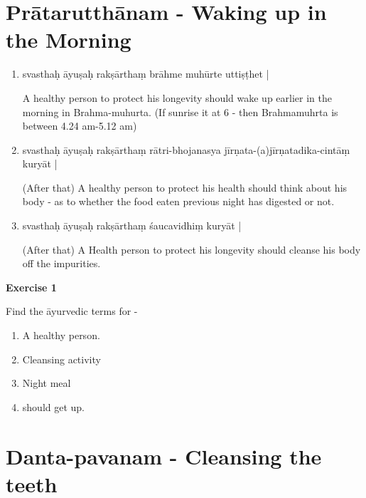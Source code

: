 \chapter{Prātarutthānam - Waking up in the Morning}

\begin{enumerate}
\item {}

svasthaḥ āyuṣaḥ rakṣārthaṃ brāhme muhūrte uttiṣṭhet |

A healthy person to protect his longevity should wake up earlier in the morning in Brahma-muhurta. (If sunrise it at 6 - then Brahmamuhrta is between 4.24 am-5.12 am) 

\item {}

svasthaḥ āyuṣaḥ rakṣārthaṃ  rātri-bhojanasya jīrṇata-(a)jīrṇatadika-cintāṃ kuryāt | 

(After that) A healthy person to protect his health should think about his body - as to whether the food eaten previous night has digested or not. 

\item {}

svasthaḥ āyuṣaḥ rakṣārthaṃ   śaucavidhiṃ kuryāt | 

(After that) A Health person to protect his longevity should cleanse his body off the impurities.
\end{enumerate}

\begin{center}
\textbf{\large Exercise 1}
\end{center}

Find the āyurvedic terms for - 
\begin{enumerate}
\renewcommand{\theenumi}{\alph{enumi}}
\renewcommand{\labelenumi}{\theenumi.}
\item A healthy person.
\item Cleansing activity
\item Night meal 
\item should get up.
\end{enumerate}

\chapter{Danta-pavanam - Cleansing the teeth}

